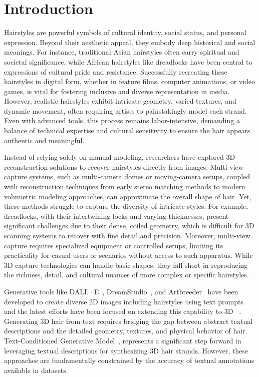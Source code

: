 
\section{Introduction}
\label{sec:intro}

Hairstyles are powerful symbols of cultural identity, social status, and personal expression. Beyond their aesthetic appeal, they embody deep historical and social meanings. For instance, traditional Asian hairstyles often carry spiritual and societal significance, while African hairstyles like dreadlocks have been central to expressions of cultural pride and resistance. Successfully recreating these hairstyles in digital form, whether in feature films, computer animations, or video games, is vital for fostering inclusive and diverse representation in media. However, realistic hairstyles exhibit intricate geometry, varied textures, and dynamic movement, often requiring artists to painstakingly model each strand. Even with advanced tools, this process remains labor-intensive, demanding a balance of technical expertise and cultural sensitivity to ensure the hair appears authentic and meaningful.


Instead of relying solely on manual modeling, researchers have explored 3D reconstruction solutions to recover hairstyles directly from images. Multi-view capture systems, such as multi-camera domes or moving-camera setups, coupled with reconstruction techniques from early stereo matching methods to modern volumetric modeling approaches, can approximate the overall shape of hair. Yet, these methods struggle to capture the diversity of intricate styles. For example, dreadlocks, with their intertwining locks and varying thicknesses, present significant challenges due to their dense, coiled geometry, which is difficult for 3D scanning systems to recover with fine detail and precision. Moreover, multi-view capture requires specialized equipment or controlled setups, limiting its practicality for casual users or scenarios without access to such apparatus. While 3D capture technologies can handle basic shapes, they fall short in reproducing the richness, detail, and cultural nuances of more complex or specific hairstyles.


Generative tools like DALL·E~\cite{betker2023dalle3}, DreamStudio~\cite{dreamstudio2025}, and Artbreeder~\cite{artbreeder2025} have been developed to create diverse 2D images including hairstyles using text prompts and the latest efforts have been focused on extending this capability to 3D ~\cite{zhang2024clay, rombach2022high, Deitke2023objaverse, Wu2023OmniObject}. Generating 3D hair from text requires bridging the gap between abstract textual descriptions and the detailed geometry, textures, and physical behavior of hair. Text-Conditioned Generative Model~\cite{HAAR:CVPR:2024}, represents a significant step forward in leveraging textual descriptions for synthesizing 3D hair strands. However, these approaches are fundamentally constrained by the accuracy of textual annotations available in datasets. 

